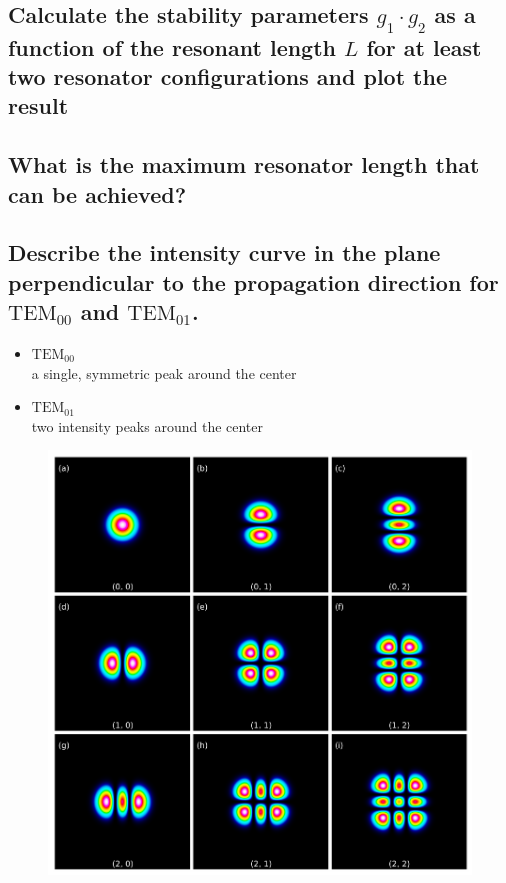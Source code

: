\subsection{Calculate the stability parameters $g_1\cdot g_2$ as a function of the 
resonant length $L$ for at least two resonator configurations and plot the result}
\subsection{What is the maximum resonator length that can be achieved?}

\subsection{Describe the intensity curve in the plane perpendicular to the 
propagation direction for $\text{TEM}_{00}$ and $\text{TEM}_{01}$.}
\begin{itemize}
    \item $\text{TEM}_{00}$ \\
    \to a single, symmetric peak around the center 
    \item $\text{TEM}_{01}$\\
    \to two intensity peaks around the center
\end{itemize}
\begin{figure}
    \centering
    \includegraphics{pictures/TEM.png}
    \label{fig:TEM}
\end{figure}

